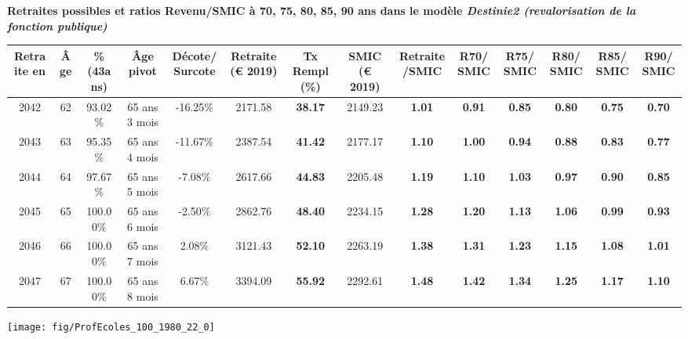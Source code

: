  \vspace{0.1cm} 
{\bf \noindent Retraites possibles et ratios Revenu/SMIC à 70, 75, 80, 85, 90 ans dans le modèle \emph{Destinie2 (revalorisation de la fonction publique)}}  
 
\begin{adjustbox}{max width=\textwidth} 
\begin{tabular}[htb]{|c|c||c|c|c||c|c||c|c||c|c|c|c|c|} 
\hline 
 Retraite en &  Âge &  \%(43ans) &  Âge pivot &  Décote/Surcote &  Retraite (\euro{} 2019) &  Tx Rempl(\%) &  SMIC (\euro{} 2019) &  Retraite/SMIC &  R70/SMIC &  R75/SMIC &  R80/SMIC &  R85/SMIC &  R90/SMIC \\ 
\hline \hline 
 2042 &  62 &  93.02\% &  65 ans 3 mois &  -16.25\% &  2171.58 &  {\bf 38.17} &  2149.23 &  {\bf 1.01} &  {\bf {\color{red} 0.91}} &  {\bf {\color{red} 0.85}} &  {\bf {\color{red} 0.80}} &  {\bf {\color{red} 0.75}} &  {\bf {\color{red} 0.70}} \\ 
\hline 
 2043 &  63 &  95.35\% &  65 ans 4 mois &  -11.67\% &  2387.54 &  {\bf 41.42} &  2177.17 &  {\bf 1.10} &  {\bf 1.00} &  {\bf {\color{red} 0.94}} &  {\bf {\color{red} 0.88}} &  {\bf {\color{red} 0.83}} &  {\bf {\color{red} 0.77}} \\ 
\hline 
 2044 &  64 &  97.67\% &  65 ans 5 mois &  -7.08\% &  2617.66 &  {\bf 44.83} &  2205.48 &  {\bf 1.19} &  {\bf 1.10} &  {\bf 1.03} &  {\bf {\color{red} 0.97}} &  {\bf {\color{red} 0.90}} &  {\bf {\color{red} 0.85}} \\ 
\hline 
 2045 &  65 &  100.00\% &  65 ans 6 mois &  -2.50\% &  2862.76 &  {\bf 48.40} &  2234.15 &  {\bf 1.28} &  {\bf 1.20} &  {\bf 1.13} &  {\bf 1.06} &  {\bf {\color{red} 0.99}} &  {\bf {\color{red} 0.93}} \\ 
\hline 
 2046 &  66 &  100.00\% &  65 ans 7 mois &  2.08\% &  3121.43 &  {\bf 52.10} &  2263.19 &  {\bf 1.38} &  {\bf 1.31} &  {\bf 1.23} &  {\bf 1.15} &  {\bf 1.08} &  {\bf 1.01} \\ 
\hline 
 2047 &  67 &  100.00\% &  65 ans 8 mois &  6.67\% &  3394.09 &  {\bf 55.92} &  2292.61 &  {\bf 1.48} &  {\bf 1.42} &  {\bf 1.34} &  {\bf 1.25} &  {\bf 1.17} &  {\bf 1.10} \\ 
\hline 
\hline 
\end{tabular} 
\end{adjustbox} 
 
 \vspace{0.1cm} 

 {\hspace{-2.2cm}\texttt{[image: fig/ProfEcoles\_100\_1980\_22\_0]}} 

